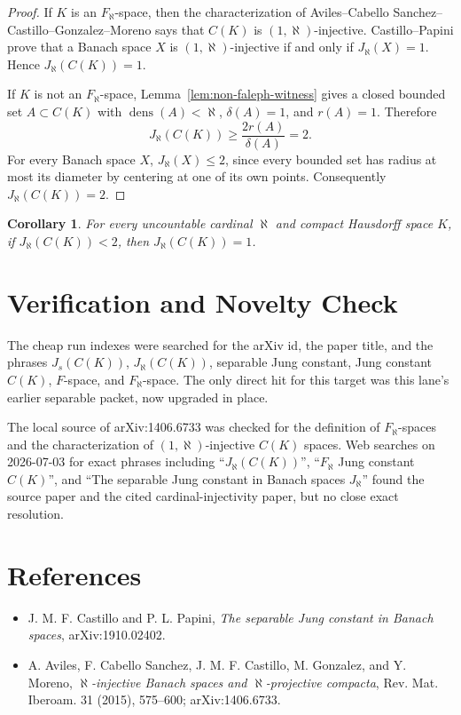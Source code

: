 \documentclass[11pt]{article}
\newtheorem{corollary}{Corollary}
\newcommand{\dens}{\operatorname{dens}}
\begin{document}
\begin{proof}
If \(K\) is an \(F_{\aleph}\)-space, then the characterization of
Aviles--Cabello Sanchez--Castillo--Gonzalez--Moreno says that \(C(K)\) is
\((1,\aleph)\)-injective. Castillo--Papini prove that a Banach space \(X\)
is \((1,\aleph)\)-injective if and only if \(J_{\aleph}(X)=1\). Hence
\(J_{\aleph}(C(K))=1\).

If \(K\) is not an \(F_{\aleph}\)-space,
Lemma~\ref{lem:non-faleph-witness} gives a closed bounded set
\(A\subset C(K)\) with \(\dens(A)<\aleph\), \(\delta(A)=1\), and
\(r(A)=1\). Therefore
\[
        J_{\aleph}(C(K))\geq \frac{2r(A)}{\delta(A)}=2.
\]
For every Banach space \(X\), \(J_{\aleph}(X)\leq 2\), since every
bounded set has radius at most its diameter by centering at one of its own
points. Consequently \(J_{\aleph}(C(K))=2\).
\end{proof}

\begin{corollary}
For every uncountable cardinal \(\aleph\) and compact Hausdorff space
\(K\), if \(J_{\aleph}(C(K))<2\), then \(J_{\aleph}(C(K))=1\).
\end{corollary}

\section*{Verification and Novelty Check}

The cheap run indexes were searched for the arXiv id, the paper title, and
the phrases \(J_s(C(K))\), \(J_{\aleph}(C(K))\), separable Jung constant,
Jung constant \(C(K)\), \(F\)-space, and \(F_{\aleph}\)-space. The only
direct hit for this target was this lane's earlier separable packet, now
upgraded in place.

The local source of arXiv:1406.6733 was checked for the definition of
\(F_{\aleph}\)-spaces and the characterization of \((1,\aleph)\)-injective
\(C(K)\) spaces. Web searches on 2026-07-03 for exact phrases including
``\(J_{\aleph}(C(K))\)'', ``\(F_{\aleph}\) Jung constant \(C(K)\)'', and
``The separable Jung constant in Banach spaces \(J_{\aleph}\)'' found the
source paper and the cited cardinal-injectivity paper, but no close exact
resolution.

\section*{References}

\begin{itemize}
\item J. M. F. Castillo and P. L. Papini, \emph{The separable Jung constant
in Banach spaces}, arXiv:1910.02402.
\item A. Aviles, F. Cabello Sanchez, J. M. F. Castillo, M. Gonzalez, and
Y. Moreno, \emph{\(\aleph\)-injective Banach spaces and
\(\aleph\)-projective compacta}, Rev. Mat. Iberoam. 31 (2015), 575--600;
arXiv:1406.6733.
\end{itemize}
\end{document}
